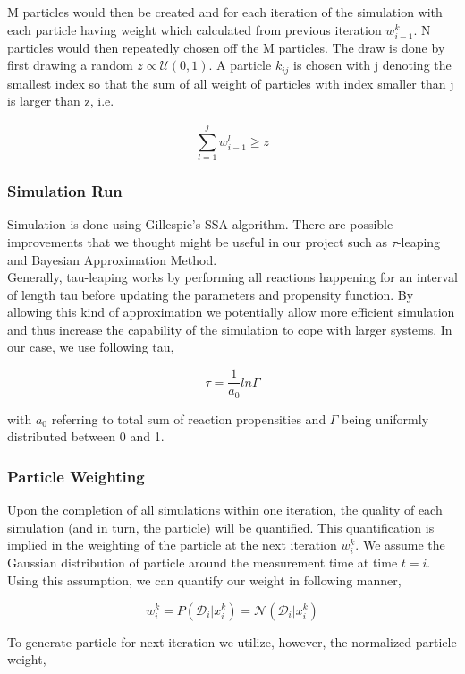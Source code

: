 \documentclass[12pt, oneside]{article}
\begin{document}
M particles would then be created and for each iteration of the simulation with each particle having weight which calculated from previous iteration $w_{i - 1}^k$. N particles would then repeatedly chosen off the M particles. The draw is done by first drawing a random $z \propto \mathcal{U}(0, 1)$. A particle $k_{ij}$ is chosen with j denoting the smallest index so that the sum of all weight of particles with index smaller than j is larger than z, i.e.

$$\sum_{l=1}^{j} w_{i - 1}^l \geq z$$

\subsubsection{Simulation Run}

Simulation is done using Gillespie's SSA algorithm. There are possible improvements that we thought might be useful in our project such as $\tau$-leaping and Bayesian Approximation Method.\\

Generally, tau-leaping works by performing all reactions happening for an interval of length tau before updating the parameters and propensity function. By allowing this kind of approximation we potentially allow more efficient simulation and thus increase the capability of the simulation to cope with larger systems. In our case, we use following tau,

$$\tau = \frac{1}{a_0} ln \Gamma$$

with $a_0$ referring to total sum of reaction propensities and $\Gamma$ being uniformly distributed between 0 and 1. 

\subsubsection{Particle Weighting}

Upon the completion of all simulations within one iteration, the quality of each simulation (and in turn, the particle) will be quantified. This quantification is implied in the weighting of the particle at the next iteration $w_{i}^k$. We assume the Gaussian distribution of particle around the measurement time at time $t=i$. Using this assumption, we can quantify our weight in following manner,

$$w_i^k = P(\mathcal{D}_i | x_i^k) = \mathcal{N}(\mathcal{D}_i | x_i^k)$$

To generate particle for next iteration we utilize, however, the normalized particle weight,
\end{document}
